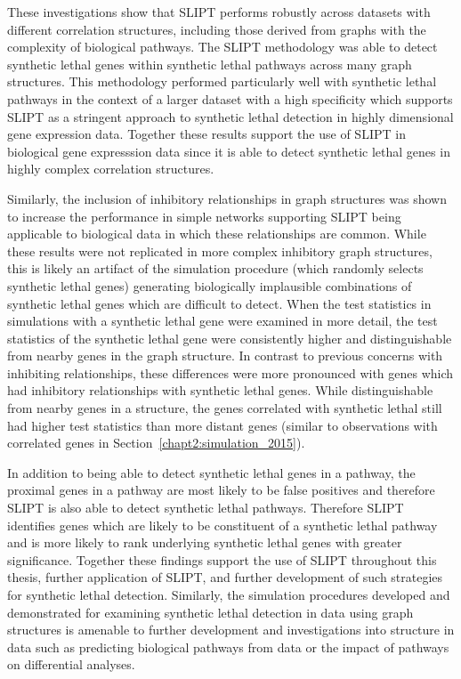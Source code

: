 These investigations show that \gls{SLIPT} performs robustly across datasets with different correlation structures, including those derived from \glspl{graph} with the complexity of biological pathways. The \gls{SLIPT} methodology was able to detect \gls{synthetic lethal} genes within \gls{synthetic lethal} pathways across many \gls{graph} structures. This methodology performed particularly well with \gls{synthetic lethal} pathways in the context of a larger dataset with a high specificity which supports \gls{SLIPT} as a stringent approach to \gls{synthetic lethal} detection in highly dimensional \gls{gene expression} data. Together these results support the use of \gls{SLIPT} in biological gene expresssion data since it is able to detect \gls{synthetic lethal} genes in highly complex correlation structures.

Similarly, the inclusion of inhibitory relationships in \gls{graph} structures was shown to increase the performance in simple networks supporting \gls{SLIPT} being applicable to biological data in which these relationships are common. While these results were not replicated in more complex inhibitory \gls{graph} structures, this is likely an artifact of the simulation procedure (which randomly selects \gls{synthetic lethal} genes) generating biologically implausible combinations of \gls{synthetic lethal} genes which are difficult to detect. When the test statistics in simulations with a \gls{synthetic lethal} gene were examined in more detail, the test statistics of the \gls{synthetic lethal} gene were consistently higher and distinguishable from nearby genes in the \gls{graph} structure. In contrast to previous concerns with inhibiting relationships, these differences were more pronounced with genes which had inhibitory relationships with \gls{synthetic lethal} genes. While distinguishable from nearby genes in a  structure, the genes correlated with \gls{synthetic lethal} still had higher test statistics than more distant genes (similar to observations with correlated genes in Section~\ref{chapt2:simulation_2015}).

In addition to being able to detect \gls{synthetic lethal} genes in a pathway, the proximal genes in a pathway are most likely to be false positives and therefore \gls{SLIPT} is also able to detect \gls{synthetic lethal} pathways. Therefore \gls{SLIPT} identifies genes which are likely to be constituent of a \gls{synthetic lethal} pathway and is more likely to rank underlying \gls{synthetic lethal} genes with greater significance. Together these findings support the use of \gls{SLIPT} throughout this thesis, further application of \gls{SLIPT}, and further development of such strategies for \gls{synthetic lethal} detection. Similarly, the simulation procedures developed and demonstrated for examining \gls{synthetic lethal} detection in  data using \gls{graph} structures is amenable to further development and investigations into  structure in  data such as predicting biological pathways from  data or the impact of pathways on differential  analyses.


